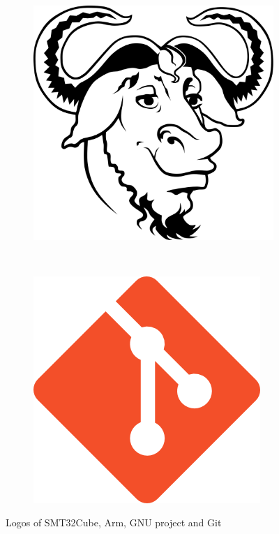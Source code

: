 \documentclass[a4paper,twoside,12pt]{book}
\begin{document}
\begin{figure}[H]
\begin{subfigure}[h]{0.23\textwidth}
    \end{subfigure}
    ~
    \begin{subfigure}[h]{0.23\textwidth}
        \includegraphics[width=\textwidth]{images/gnu_logo}
        \label{fig:gnu}
    \end{subfigure}
    ~
    \begin{subfigure}[h]{0.23\textwidth}
        \includegraphics[width=\textwidth]{images/git}
        \label{fig:git}
    \end{subfigure}
    \caption{Logos of SMT32Cube, Arm, GNU project and Git}
    \label{fig:tools}
\end{figure}
\end{document}
